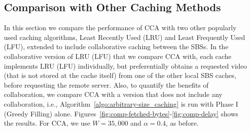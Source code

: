 \documentclass[conference]{IEEEtran}
\begin{document}











\subsection{Comparison with Other Caching Methods}
\label{sec:comp}

In this section we compare the performance of CCA with two other popularly used caching algorithms, Least Recently Used (LRU) and Least Frequently Used (LFU), extended to include collaborative caching between the SBSs. In the collaborative version of LRU (LFU) that we compare CCA with, each cache implements LRU (LFU) individually, but preferentially obtains a requested video (that is not stored at the cache itself) from one of the other local SBS caches, before requesting the remote server. Also, to quantify the benefits of collaboration, we compare CCA with a version that does not include any collaboration, i.e., Algorithm~\ref{algo:arbitrary-size_caching} is run with Phase I (Greedy Filling) alone.
Figures~\ref{fig:comp-fetched-bytes}-\ref{fig:comp-delay} shows the results. For CCA, we use $W=35,000$ and $\alpha=0.4$, as before. 
\end{document}
